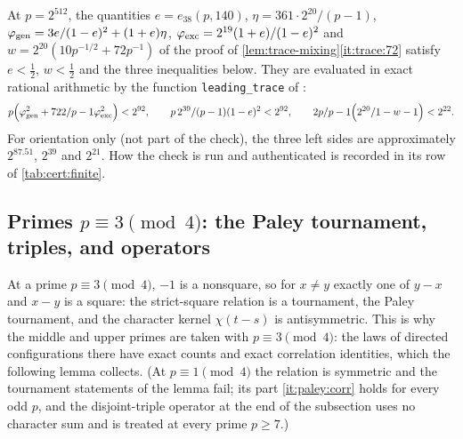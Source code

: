 \begin{certificate}[Mixing constants of the two-layer root at $p=2^{512}$]
\label{cert:trace-mixing-72}
At $p=2^{512}$, the quantities $e=e_{38}(p,140)$,
$\eta=361\cdot2^{20}/(p-1)$, $\varphi_{\rm gen}=3e/(1-e)^2+(1+e)\eta$,
$\varphi_{\rm exc}=2^{19}(1+e)/(1-e)^2$ and $w=2^{20}(10p^{-1/2}+72p^{-1})$
of the proof of \cref{lem:trace-mixing}\ref{it:trace:72} satisfy
$e<\frac12$, $w<\frac12$ and the three inequalities below. They are
evaluated in exact rational arithmetic by the function
\texttt{leading\_trace} of
:
\[
 p\Bigl(\varphi_{\rm gen}^2+\frac{722}{p-1}\varphi_{\rm exc}^2\Bigr)<2^{92},\qquad
 \frac{p\,2^{39}}{(p-1)(1-e)^2}<2^{92},\qquad
 \frac{2p}{p-1}\Bigl(\frac{2^{20}}{1-w}-1\Bigr)<2^{22} .
\]
For orientation only (not part of the check), the three left sides are approximately $2^{87.51}$, $2^{39}$ and $2^{21}$. How the check
is run and authenticated is recorded in its row of \cref{tab:cert:finite}.
\end{certificate}

\subsection{Primes \texorpdfstring{$p\equiv3\pmod4$}{p = 3 (mod 4)}: the Paley tournament, triples, and operators}\label{subsec:labellings:class-three}

At a prime $p\equiv3\pmod4$, $-1$ is a nonsquare, so for $x\ne y$ exactly one of
$y-x$ and $x-y$ is a square: the strict-square relation is a tournament, the
Paley tournament, and the character kernel $\chi(t-s)$ is antisymmetric. This is
why the middle and upper primes are taken with
$p\equiv3\pmod4$: the laws of directed
configurations there have exact counts and exact correlation identities, which
the following lemma collects. (At $p\equiv1\pmod4$ the relation is symmetric
and the tournament statements of the lemma fail; its part \ref{it:paley:corr}
holds for every odd $p$, and the disjoint-triple operator at the end of the
subsection uses no character sum and is treated at every prime $p\ge7$.)

